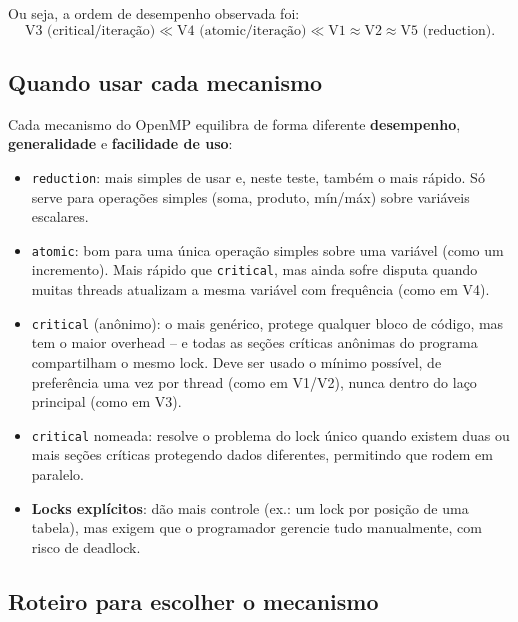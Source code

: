 \documentclass[a4paper,12pt]{article}
\begin{document}
Ou seja, a ordem de desempenho observada foi:
$$\text{V3 (critical/iteração)} \ll \text{V4 (atomic/iteração)} \ll \text{V1} \approx \text{V2} \approx \text{V5 (reduction)}.$$

\subsection{Quando usar cada mecanismo}

Cada mecanismo do OpenMP equilibra de forma diferente
\textbf{desempenho}, \textbf{generalidade} e \textbf{facilidade de
uso}:

\begin{itemize}
    \item \texttt{reduction}: mais simples de usar e, neste teste,
    também o mais rápido. Só serve para operações simples (soma,
    produto, mín/máx) sobre variáveis escalares.

    \item \texttt{atomic}: bom para uma única operação simples sobre
    uma variável (como um incremento). Mais rápido que
    \texttt{critical}, mas ainda sofre disputa quando muitas threads
    atualizam a mesma variável com frequência (como em V4).

    \item \texttt{critical} (anônimo): o mais genérico, protege
    qualquer bloco de código, mas tem o maior overhead -- e todas as
    seções críticas anônimas do programa compartilham o mesmo lock.
    Deve ser usado o mínimo possível, de preferência uma vez por
    thread (como em V1/V2), nunca dentro do laço principal (como em
    V3).

    \item \texttt{critical} nomeada: resolve o problema do lock único
    quando existem duas ou mais seções críticas protegendo dados
    diferentes, permitindo que rodem em paralelo.

    \item \textbf{Locks explícitos}: dão mais controle (ex.: um lock
    por posição de uma tabela), mas exigem que o programador
    gerencie tudo manualmente, com risco de deadlock.
\end{itemize}

\subsection{Roteiro para escolher o mecanismo}
\end{document}
